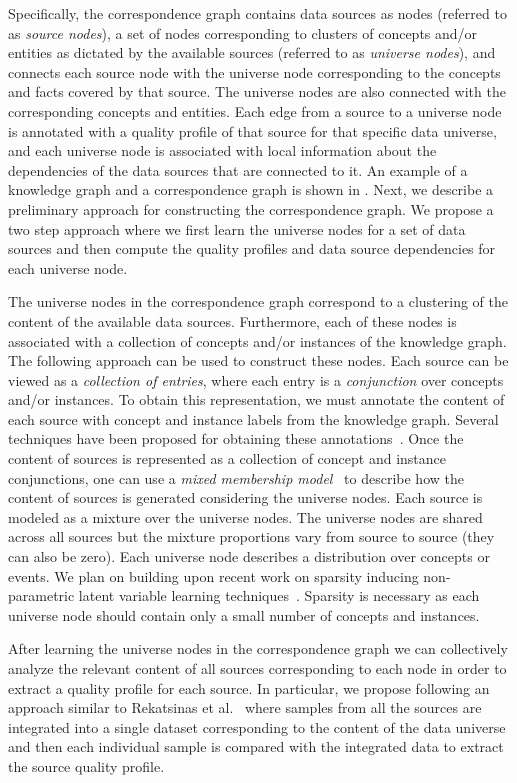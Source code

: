 \documentclass{sig-alternate}
\begin{document}
Specifically, the correspondence graph contains data sources as nodes (referred to as {\em source nodes}), a set of nodes corresponding to clusters of concepts and/or entities as dictated by the available sources (referred to as {\em universe nodes}), and connects each source node with the universe node corresponding to the concepts and facts covered by that source. The universe nodes are also connected with the corresponding concepts and entities.  Each edge from a source to a universe node is annotated with a quality profile of that source for that specific data universe, and each universe node is associated with local information about the dependencies of the data sources that are connected to it. An example of a knowledge graph and a correspondence graph is shown in . Next, we describe a preliminary approach for constructing the correspondence graph. We propose a two step approach where we first learn the universe nodes for a set of data sources and then compute the quality profiles and data source dependencies for each universe node. 

The universe nodes in the correspondence graph correspond to a clustering of the content of the available data sources. Furthermore, each of these nodes is associated with a collection of concepts and/or instances of the knowledge graph. The following approach can be used to construct these nodes. Each source can be viewed as a {\em collection of entries}, where each entry is a {\em conjunction} over concepts and/or instances. To obtain this representation, we must annotate the content of each source with concept and instance labels from the knowledge graph. Several techniques have been proposed for obtaining these annotations~\cite{spotlight,limaye:2010}. Once the content of sources is represented as a collection of concept and instance conjunctions, one can use a {\em mixed membership model}~\cite{blei:2003} to describe how the content of sources is generated considering the universe nodes. Each source is modeled as a mixture over the universe nodes. The universe nodes are shared across all sources but the mixture proportions vary from source to source (they can also be zero). Each universe node describes a distribution over concepts or events. We plan on building upon recent work on sparsity inducing non-parametric latent variable learning techniques~\cite{elidan:2005, sdm:2013}. Sparsity is necessary as each universe node should contain only a small number of concepts and instances. 

After learning the universe nodes in the correspondence graph we can collectively analyze the relevant content of all sources corresponding to each node in order to extract a quality profile for each source. In particular, we propose following an approach similar to Rekatsinas et al.~\cite{rekatsinas:2014} where samples from all the sources are integrated into a single dataset corresponding to the content of the data universe and then each individual sample is compared with the integrated data to extract the source quality profile. 
\end{document}
